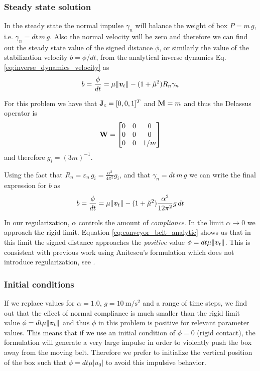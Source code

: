 \subsubsection{Steady state solution}
In the steady state the normal impulse $\gamma_n$ will balance the weight of box
$P=m\,g$, i.e. $\gamma_n=dt\,m\,g$. Also the normal velocity will be zero and
therefore we can find out the steady state value of the signed distance $\phi$,
or similarly the value of the stabilization velocity $b=\phi/dt$, from the
analytical inverse dynamics Eq. \ref{eq:inverse_dynamics_velocity} as
\begin{eqnarray}
	b=\frac{\phi}{dt}=\mu\Vert{\bm{v}}_t\Vert-(1+\tilde\mu^2)R_n\gamma_n
\end{eqnarray}

For this problem we have that ${\mathbf{J}}_c=[0, 0, 1]^T$ and ${\mathbf{M}}=m$ and thus the
Delassus operator is
\begin{equation}
	{\mathbf{W}} = \begin{bmatrix}
		0 & 0 & 0\\
		0 & 0 & 0\\
		0 & 0 & 1/m\\
		\end{bmatrix}
\end{equation}
and therefore $g_i=(3m)^{-1}$.

Using the fact that $R_n=\varepsilon_n\,g_i = \frac{\alpha^2}{4\pi^2}g_i$, and
that $\gamma_n=dt\,m\,g$ we can write the final expression for $b$ as
\begin{eqnarray}
	b=\frac{\phi}{dt}=\mu\Vert\vf{v}_t\Vert-(1+\tilde\mu^2)\frac{\alpha^2}{12\pi^2}g\,dt
	\label{eq:conveyor_belt_analytic}
\end{eqnarray}

In our regularization, $\alpha$ controls the amount of \textit{compliance}. In
the limit $\alpha\rightarrow 0$ we approach the rigid limit. Equation
\ref{eq:conveyor_belt_analytic} shows us that in this limit the signed distance
approaches the \textit{positive} value $\phi = dt\mu\Vert{\bm{v}}_t\Vert$. This is
consistent with previous work using Anitescu's formulation which does not
introduce regularization, see \cite{bib:anitescu2006, bib:mazhar2014}.

\subsubsection{Initial conditions}
If we replace values for $\alpha=1.0$, $g=10~\text{m}/\text{s}^2$ and a range of
time steps, we find out that the effect of normal compliance is much smaller
than the rigid limit value $\phi = dt\mu\Vert{\bm{v}}_t\Vert$ and thus $\phi$ in
this problem is positive for relevant parameter values. This means that if we
use an initial condition of $\phi=0$ (rigid contact), the formulation will
generate a very large impulse in order to violently push the box away from the
moving belt. Therefore we prefer to initialize the vertical position of the box
such that $\phi = dt\mu|u_0|$ to avoid this impulsive behavior.

